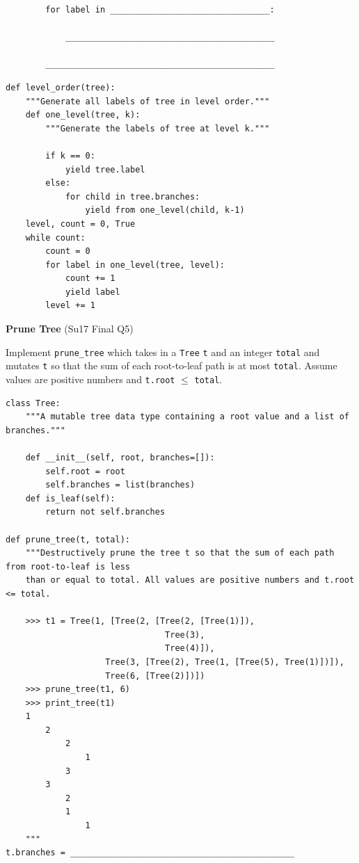 \documentclass{exam}
\newlength{\currentparskip}
\newenvironment{blocksection}
{
    \setlength{\currentparskip}{\parskip}%
    \begin{minipage}{\linewidth}
    \setlength{\parskip}{\currentparskip}%
}
{
    \end{minipage}
}
\begin{document}
\begin{questions}
\begin{blocksection}
\begin{lstlisting}
        for label in ________________________________:

            __________________________________________

        ______________________________________________
\end{lstlisting}
\end{blocksection}
\begin{solution}
\begin{lstlisting}
def level_order(tree):
    """Generate all labels of tree in level order."""
    def one_level(tree, k):
        """Generate the labels of tree at level k."""
            
        if k == 0:
            yield tree.label
        else:
            for child in tree.branches:
                yield from one_level(child, k-1)
    level, count = 0, True
    while count:
        count = 0
        for label in one_level(tree, level):
            count += 1
            yield label
        level += 1
\end{lstlisting}
\end{solution}

\begin{blocksection}
\question \textbf{Prune Tree} (Su17 Final Q5)

    Implement \lstinline{prune_tree} which takes in a \lstinline{Tree} \lstinline{t} and an integer \lstinline{total} and mutates \lstinline{t} so that the sum of each
    root-to-leaf path is at most \lstinline{total}. Assume values are positive numbers and \lstinline{t.root} $\leq$ \lstinline{total}.
\begin{lstlisting}
class Tree:
    """A mutable tree data type containing a root value and a list of branches."""
    
    def __init__(self, root, branches=[]):
        self.root = root
        self.branches = list(branches)
    def is_leaf(self):
        return not self.branches

def prune_tree(t, total):
    """Destructively prune the tree t so that the sum of each path from root-to-leaf is less
    than or equal to total. All values are positive numbers and t.root <= total.

    >>> t1 = Tree(1, [Tree(2, [Tree(2, [Tree(1)]),
                                Tree(3),
                                Tree(4)]),
                    Tree(3, [Tree(2), Tree(1, [Tree(5), Tree(1)])]),
                    Tree(6, [Tree(2)])])
    >>> prune_tree(t1, 6)
    >>> print_tree(t1)
    1
        2
            2
                1
            3
        3
            2
            1
                1
    """
t.branches = _____________________________________________


\end{lstlisting}
\end{blocksection}
\end{questions}
\end{document}
